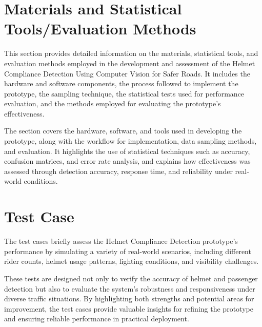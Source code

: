 \begin{refsection}
\section*{Materials and Statistical Tools/Evaluation Methods}


This section provides detailed information on the materials, statistical tools, and evaluation methods employed in the development and assessment of the Helmet Compliance Detection Using Computer Vision for Safer Roads. It includes the hardware and software components, the process followed to implement the prototype, the sampling technique, the statistical tests used for performance evaluation, and the methods employed for evaluating the prototype's effectiveness.

The section covers the hardware, software, and tools used in developing the prototype, along with the workflow for implementation, data sampling methods, and evaluation. It highlights the use of statistical techniques such as accuracy, confusion matrices, and error rate analysis, and explains how effectiveness was assessed through detection accuracy, response time, and reliability under real-world conditions.

\section*{Test Case}


The test cases briefly assess the Helmet Compliance Detection prototype’s performance by simulating a variety of real-world scenarios, including different rider counts, helmet usage patterns, lighting conditions, and visibility challenges.


These tests are designed not only to verify the accuracy of helmet and passenger detection but also to evaluate the system’s robustness and responsiveness under diverse traffic situations. By highlighting both strengths and potential areas for improvement, the test cases provide valuable insights for refining the prototype and ensuring reliable performance in practical deployment.



\end{refsection}
